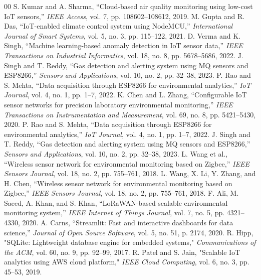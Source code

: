 \documentclass[journal,onecolumn]{IEEEtran}
\begin{document}

\begin{thebibliography}{00}
 S. Kumar and A. Sharma, “Cloud-based air quality monitoring using low-cost IoT sensors,” \textit{IEEE Access}, vol. 7, pp. 108602–108612, 2019.
 M. Gupta and R. Das, “IoT-enabled climate control system using NodeMCU,” \textit{International Journal of Smart Systems}, vol. 5, no. 3, pp. 115–122, 2021.
 D. Verma and K. Singh, ``Machine learning-based anomaly detection in IoT sensor data,'' \textit{IEEE Transactions on Industrial Informatics}, vol. 18, no. 8, pp. 5678--5686, 2022.
 J. Singh and T. Reddy, ``Gas detection and alerting system using MQ sensors and ESP8266,'' \textit{Sensors and Applications}, vol. 10, no. 2, pp. 32--38, 2023.
 P. Rao and S. Mehta, ``Data acquisition through ESP8266 for environmental analytics,'' \textit{IoT Journal}, vol. 4, no. 1, pp. 1--7, 2022.
 K. Chen and L. Zhang, ``Configurable IoT sensor networks for precision laboratory environmental monitoring,'' \textit{IEEE Transactions on Instrumentation and Measurement}, vol. 69, no. 8, pp. 5421--5430, 2020.
 P. Rao and S. Mehta, “Data acquisition through ESP8266 for environmental analytics,” \textit{IoT Journal}, vol. 4, no. 1, pp. 1–7, 2022.
 J. Singh and T. Reddy, “Gas detection and alerting system using MQ sensors and ESP8266,” \textit{Sensors and Applications}, vol. 10, no. 2, pp. 32–38, 2023.
 L. Wang et al., “Wireless sensor network for environmental monitoring based on Zigbee,” \textit{IEEE Sensors Journal}, vol. 18, no. 2, pp. 755–761, 2018.
 L. Wang, X. Li, Y. Zhang, and H. Chen, “Wireless sensor network for environmental monitoring based on Zigbee,” \textit{IEEE Sensors Journal}, vol. 18, no. 2, pp. 755–761, 2018.
 F. Ali, M. Saeed, A. Khan, and S. Khan, “LoRaWAN-based scalable environmental monitoring system,” \textit{IEEE Internet of Things Journal}, vol. 7, no. 5, pp. 4321–4330, 2020.
 A. Carns, “Streamlit: Fast and interactive dashboards for data science,” \textit{Journal of Open Source Software}, vol. 5, no. 51, p. 2174, 2020.
 R. Hipp, "SQLite: Lightweight database engine for embedded systems," \textit{Communications of the ACM}, vol. 60, no. 9, pp. 92–99, 2017.
 R. Patel and S. Jain, "Scalable IoT analytics using AWS cloud platform," \textit{IEEE Cloud Computing}, vol. 6, no. 3, pp. 45--53, 2019.

\end{thebibliography}
\end{document}
